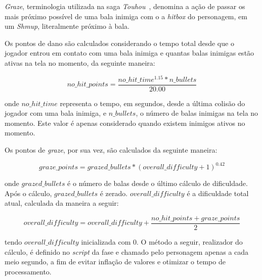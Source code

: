 \textit{Graze}, terminologia utilizada na saga \textit{Touhou}~\citep{Touhou}, denomina a ação de passar os mais próximo possível de uma bala inimiga com o a \textit{hitbox} do personagem, em um \textit{Shmup}, literalmente \textquotedbl{} próximo à bala.

Os pontos de dano são calculados considerando o tempo total desde que o jogador entrou em contato com uma bala inimiga e quantas balas inimigas estão ativas na tela no momento, da seguinte maneira:

$$
no\_hit\_points = \frac{no\_hit\_time^{1.15} * n\_bullets}{20.00}
$$

onde $no\_hit\_time$ representa o tempo, em segundos, desde a última colisão do jogador com uma bala inimiga, e $n\_bullets$, o número de balas inimigas na tela no momento. Este valor é apenas considerado quando existem inimigos ativos no momento.

Os pontos de \textit{graze}, por sua vez, são calculados da seguinte maneira:

$$
graze\_points = grazed\_bullets * (overall\_difficulty + 1)^{0.42}
$$

onde $grazed\_bullets$ é o número de balas \textquotedbl{} desde o último cálculo de dificuldade. Após o cálculo, $grazed\_bullets$ é zerado. $overall\_difficulty$ é a dificuldade total atual, calculada da maneira a seguir:

$$
overall\_difficulty = overall\_difficulty + \frac{no\_hit\_points + graze\_points}{2}
$$\label{overallDiffCalc}

tendo $overall\_difficulty$ inicializada com 0. O método a seguir, realizador do cálculo, é definido no \textit{script} da fase e chamado pelo personagem apenas a cada meio segundo, a fim de evitar inflação de valores e otimizar o tempo de processamento.

